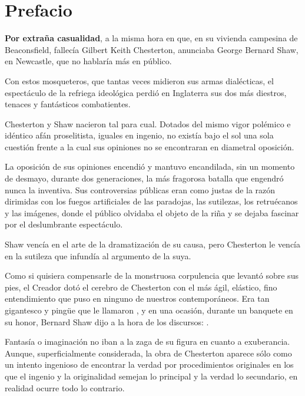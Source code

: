 \chapter{Prefacio}%
\label{cha:Prefacio}

\textbf{Por extraña casualidad}, a la misma hora en que, en su vivienda campesina de Beaconsfield, fallecía
Gilbert Keith Chesterton, anunciaba George Bernard Shaw, en Newcastle, que no hablaría más en
público.

Con estos mosqueteros, que tantas veces midieron sus armas dialécticas, el espectáculo de la
refriega ideológica perdió en Inglaterra sus dos más diestros, tenaces y fantásticos combatientes.

Chesterton y Shaw nacieron tal para cual. Dotados del mismo vigor polémico e idéntico afán
proselitista, iguales en ingenio, no existía bajo el sol una sola cuestión frente a la cual sus opiniones no se
encontraran en diametral oposición.

La oposición de sus opiniones encendió y mantuvo encandilada, sin un momento de desmayo,
durante dos generaciones, la más fragorosa batalla que engendró nunca la inventiva. Sus controversias
públicas eran como justas de la razón dirimidas con los fuegos artificiales de las paradojas, las sutilezas,
los retruécanos y las imágenes, donde el público olvidaba el objeto de la riña y se dejaba fascinar por el
deslumbrante espectáculo.

Shaw vencía en el arte de la dramatización de su causa, pero Chesterton le vencía en la sutileza que
infundía al argumento de la suya.

Como si quisiera compensarle de la monstruosa corpulencia que levantó sobre sus pies, el Creador
dotó el cerebro de Chesterton con el más ágil, elástico, fino entendimiento que puso en ninguno de
nuestros contemporáneos. Era tan gigantesco y pingüe que le llamaron ,
y en una ocasión, durante un banquete en su honor, Bernard Shaw dijo a la hora de los discursos: .

Fantasía o imaginación no iban a la zaga de su figura en cuanto a exuberancia.
Aunque, superficialmente considerada, la obra de Chesterton aparece sólo como un intento
ingenioso de encontrar la verdad por procedimientos originales en los que el ingenio y la originalidad
semejan lo principal y la verdad lo secundario, en realidad ocurre todo lo contrario.

